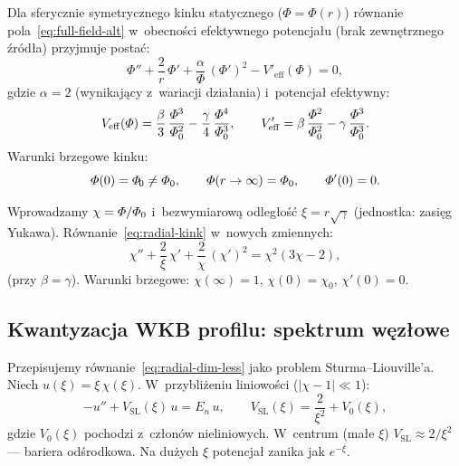 Dla sferycznie symetrycznego kinku statycznego ($\Phi = \Phi(r)$)
r\'ownanie pola~\eqref{eq:full-field-alt} w~obecno\'sci
efektywnego potencja\l{}u (brak zewn\k{e}trznego \'zr\'od\l{}a)
przyjmuje posta\'c:
\begin{equation}\label{eq:radial-kink}
    \Phi'' + \frac{2}{r}\,\Phi'
    + \frac{\alpha}{\Phi}\,(\Phi')^2
    - V'_{\mathrm{eff}}(\Phi)
    = 0,
\end{equation}
gdzie $\alpha = 2$ (wynikaj\k{a}cy z~wariacji dzia\l{}ania)
i~potencja\l{} efektywny:
\begin{equation}\label{eq:Veff-kink}
    V_{\mathrm{eff}}(\varPhi)
    = \frac{\beta}{3}\,\frac{\varPhi^3}{\varPhi_0^2}
    - \frac{\gamma}{4}\,\frac{\varPhi^4}{\varPhi_0^3},
    \qquad
    V'_{\mathrm{eff}}
    = \beta\,\frac{\varPhi^2}{\varPhi_0^2}
    - \gamma\,\frac{\varPhi^3}{\varPhi_0^3}.
\end{equation}
Warunki brzegowe kinku:
\begin{equation}\label{eq:kink-bc-radial}
    \varPhi(0) = \varPhi_{\!0} \neq \varPhi_0,
    \qquad
    \varPhi(r \to \infty) = \varPhi_0,
    \qquad
    \varPhi'(0) = 0.
\end{equation}

\begin{remark}%
\label{rem:phi-rescale}
Wprowadzamy $\chi = \varPhi/\varPhi_0$ i~bezwymiarow\k{a}
odleg\l{}o\'s\'c $\xi = r\sqrt{\gamma}$ (jednostka: zasi\k{e}g Yukawa).
R\'ownanie~\eqref{eq:radial-kink} w~nowych zmiennych:
\begin{equation}\label{eq:radial-dim-less}
    \chi'' + \frac{2}{\xi}\,\chi'
    + \frac{2}{\chi}\,(\chi')^2
    = \chi^2(3\chi - 2),
\end{equation}
(przy $\beta = \gamma$). Warunki brzegowe:
$\chi(\infty) = 1$, $\chi(0) = \chi_0$, $\chi'(0) = 0$.
\end{remark}

\subsection{Kwantyzacja WKB profilu: spektrum w\k{e}z\l{}owe}%
\label{app:F-wkb}

Przepisujemy r\'ownanie~\eqref{eq:radial-dim-less} jako
problem Sturma--Liouville'a. Niech $u(\xi) = \xi\,\chi(\xi)$.
W~przybli\.zeniu liniowo\'sci ($|\chi - 1| \ll 1$):
\begin{equation}\label{eq:sl-eq}
    -u'' + V_{\mathrm{SL}}(\xi)\,u = E_n\,u,
    \qquad
    V_{\mathrm{SL}}(\xi) = \frac{2}{\xi^2} + V_0(\xi),
\end{equation}
gdzie $V_0(\xi)$ pochodzi z~cz\l{}on\'ow nieliniowych.
W~centrum (ma\l{}e $\xi$) $V_{\mathrm{SL}} \approx 2/\xi^2$ ---
bariera odśrodkowa. Na du\.zych $\xi$ potencja\l{} zanika
jak $e^{-\xi}$.


